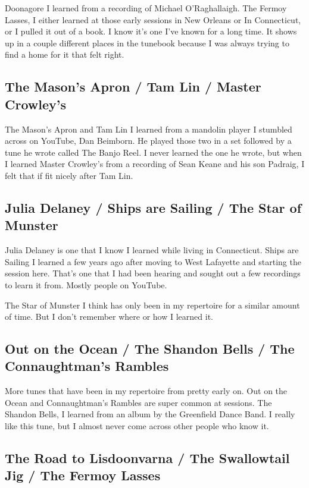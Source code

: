 \documentclass[11pt,letterpaper]{article}
\begin{document}
Doonagore I learned from a recording of Michael O'Raghallaigh. The Fermoy Lasses, I either learned at those early sessions in New Orleans or In Connecticut, or I pulled it out of a book. I know it's one I've known for a long time. It shows up in a couple different places in the tunebook because I was always trying to find a home for it that felt right. 

\subsection{The Mason's Apron / Tam Lin / Master Crowley's}

The Mason's Apron and Tam Lin I learned from a mandolin player I stumbled across on YouTube, Dan Beimborn. He played those two in a set followed by a tune he wrote called The Banjo Reel. I never learned the one he wrote, but when I learned Master Crowley's from a recording of Sean Keane and his son Padraig, I felt that if fit nicely after Tam Lin.

\subsection{Julia Delaney / Ships are Sailing / The Star of Munster}
Julia Delaney is one that I know I learned while living in Connecticut. Ships are Sailing I learned a few years ago after moving to West Lafayette and starting the session here. That's one that I had been hearing and sought out a few recordings to learn it from. Mostly people on YouTube.

The Star of Munster I think has only been in my repertoire for a similar amount of time. But I don't remember where or how I learned it. 

\subsection{Out on the Ocean / The Shandon Bells / The Connaughtman's Rambles}

More tunes that have been in my repertoire from pretty early on. Out on the Ocean and Connaughtman's Rambles are super common at sessions. The Shandon Bells, I learned from an album by the Greenfield Dance Band. I really like this tune, but I almost never come across other people who know it. 

\subsection{The Road to Lisdoonvarna / The Swallowtail Jig / The Fermoy Lasses}
\end{document}
